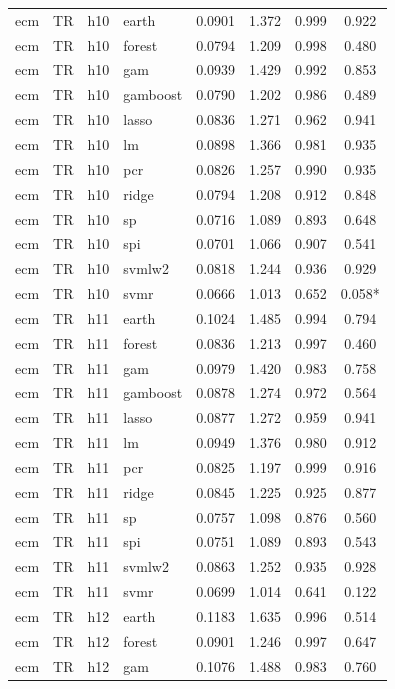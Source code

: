 \begin{ThreePartTable}
\begin{longtable}[t]{llclcccc}
\addlinespace
ecm & TR & h10 & earth & 0.0901 & 1.372 & 0.999 & 0.922\\
ecm & TR & h10 & forest & 0.0794 & 1.209 & 0.998 & 0.480\\
ecm & TR & h10 & gam & 0.0939 & 1.429 & 0.992 & 0.853\\
ecm & TR & h10 & gamboost & 0.0790 & 1.202 & 0.986 & 0.489\\
ecm & TR & h10 & lasso & 0.0836 & 1.271 & 0.962 & 0.941\\
ecm & TR & h10 & lm & 0.0898 & 1.366 & 0.981 & 0.935\\
ecm & TR & h10 & pcr & 0.0826 & 1.257 & 0.990 & 0.935\\
ecm & TR & h10 & ridge & 0.0794 & 1.208 & 0.912 & 0.848\\
ecm & TR & h10 & sp & 0.0716 & 1.089 & 0.893 & 0.648\\
ecm & TR & h10 & spi & 0.0701 & 1.066 & 0.907 & 0.541\\
ecm & TR & h10 & svmlw2 & 0.0818 & 1.244 & 0.936 & 0.929\\
ecm & TR & h10 & svmr & 0.0666 & 1.013 & 0.652 & 0.058*\\
\addlinespace
ecm & TR & h11 & earth & 0.1024 & 1.485 & 0.994 & 0.794\\
ecm & TR & h11 & forest & 0.0836 & 1.213 & 0.997 & 0.460\\
ecm & TR & h11 & gam & 0.0979 & 1.420 & 0.983 & 0.758\\
ecm & TR & h11 & gamboost & 0.0878 & 1.274 & 0.972 & 0.564\\
ecm & TR & h11 & lasso & 0.0877 & 1.272 & 0.959 & 0.941\\
ecm & TR & h11 & lm & 0.0949 & 1.376 & 0.980 & 0.912\\
ecm & TR & h11 & pcr & 0.0825 & 1.197 & 0.999 & 0.916\\
ecm & TR & h11 & ridge & 0.0845 & 1.225 & 0.925 & 0.877\\
ecm & TR & h11 & sp & 0.0757 & 1.098 & 0.876 & 0.560\\
ecm & TR & h11 & spi & 0.0751 & 1.089 & 0.893 & 0.543\\
ecm & TR & h11 & svmlw2 & 0.0863 & 1.252 & 0.935 & 0.928\\
ecm & TR & h11 & svmr & 0.0699 & 1.014 & 0.641 & 0.122\\
\addlinespace
ecm & TR & h12 & earth & 0.1183 & 1.635 & 0.996 & 0.514\\
ecm & TR & h12 & forest & 0.0901 & 1.246 & 0.997 & 0.647\\
ecm & TR & h12 & gam & 0.1076 & 1.488 & 0.983 & 0.760\\

\end{longtable}
\end{ThreePartTable}
